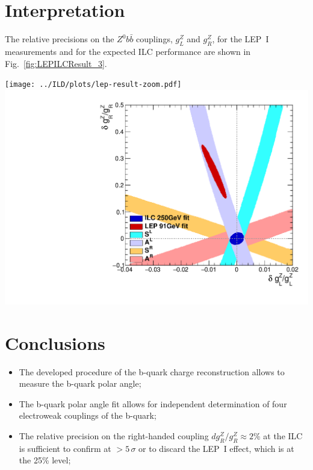 \section*{Interpretation}

The relative precisions on the $Z^0b\bar{b}$ couplings, $g_L^Z$ and $g_R^Z$, for the LEP~I measurements and for the expected ILC performance are shown in Fig.~\ref{fig:LEPILCResult_3}.
\begin{center}\vspace{1cm}

	\texttt{[image: ../ILD/plots/lep-result-zoom.pdf]}
	\includegraphics[width=0.4\linewidth]{../ILD/plots/ilc-result.pdf}
		\label{fig:LEPILCResult_3}
\end{center}\vspace{1cm}



\section*{Conclusions}

\begin{itemize}
\item The developed procedure of the b-quark charge reconstruction allows to measure the b-quark polar angle;
\item The b-quark polar angle fit allows for independent determination of four electroweak couplings of the b-quark;
\item  The relative precision on the right-handed coupling $dg^Z_R/g^Z_R\approx 2$\% at the ILC is sufficient to confirm at $>5\,\sigma$ or to discard the LEP~I effect, which is at the 25\% level;
\end{itemize}


